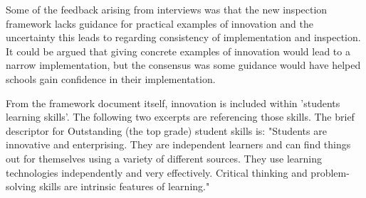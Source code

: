 Some of the feedback arising from interviews was that the new inspection framework lacks guidance for practical examples of innovation and the uncertainty this leads to regarding consistency of implementation and inspection. It could be argued that giving concrete examples of innovation would lead to a narrow implementation, but the consensus was some guidance would have helped schools gain confidence in their implementation.

From the framework document itself, innovation is included within 'students learning skills'. The following two excerpts are referencing those skills. The brief descriptor for Outstanding (the top grade) student skills is: "Students are innovative and enterprising. They are independent learners and can find things out for themselves using a variety of different sources. They use learning technologies independently and very effectively. Critical thinking and problem- solving skills are intrinsic features of learning." \cite[p. 33]{ADEC2016}

